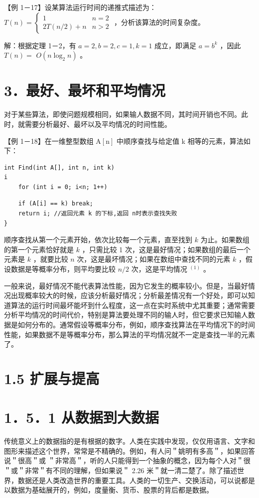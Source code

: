 \documentclass[10pt]{article}
\begin{document}
【例 1－17】设某算法运行时间的递推式描述为：$T(n)=\left\{\begin{array}{ll}1 & n=2 \\ 2 T(n / 2)+n & n>2\end{array}\right.$ ，分析该算法的时间复杂度。

解：根据定理 1－2，有 $a=2, b=2, c=1, k=1$ 成立，即满足 $a=b^{k}$ ，因此 $T(n)=$ $O\left(n \log _{2} n\right)$ 。

\section*{3．最好、最坏和平均情况}
对于某些算法，即使问题规模相同，如果输人数据不同，其时间开销也不同。此时，就需要分析最好、最坏以及平均情况的时间性能。

【例 1－18】在一维整型数组 $\mathrm{A}[\mathrm{n}]$ 中顺序查找与给定值 k 相等的元素，算法如下：

\begin{verbatim}
int Find(int A[], int n, int k)
i
    for (int i = 0; i<n; 1++)
\end{verbatim}

\begin{verbatim}
    if (A[i] == k) break;
    return i; //返回元素 k 的下标,返回 n时表示查找失败
}
\end{verbatim}

顺序查找从第一个元素开始，依次比较每一个元素，直至找到 $k$ 为止。如果数组的第一个元素恰好就是 $k$ ，只需比较 1 次，这是最好情况；如果数组的最后一个元素是 $k$ ，就要比较 $n$ 次，这是最坏情况；如果在数组中查找不同的元素 $k$ ，假设数据是等概率分布，则平均要比较 $n / 2$ 次，这是平均情况 ${ }^{(1)}$ 。

一般来说，最好情况不能代表算法性能，因为它发生的概率较小。但是，当最好情况出现概率较大的时候，应该分析最好情况；分析最差情况有一个好处，即可以知道算法的运行时间最坏能坏到什么程度，这一点在实时系统中尤其重要；通常需要分析平均情况的时间代价，特别是算法要处理不同的输人时，但它要求已知输人数据是如何分布的。通常假设等概率分布，例如，顺序查找算法在平均情况下的时间性能，如果数据不是等概率分布，那么算法的平均情况就不一定是查找一半的元素了。

\section*{1.5 扩展与提高}
\section*{1．5．1 从数据到大数据}
传统意义上的数据指的是有根据的数字。人类在实践中发现，仅仅用语言、文字和图形来描述这个世界，常常是不精确的。例如，有人问＂姚明有多高＂，如果回答说＂很高＂或 ＂非常高＂，听的人只能得到一个抽象的概念，因为每个人对＂很＂或＂非常＂有不同的理解，但如果说＂ 2.26 米＂就一清二楚了。除了描述世界，数据还是人类改造世界的重要工具。人类的一切生产、交换活动，可以说都是以数据为基础展开的，例如，度量衡、货币、股票的背后都是数据。
\end{document}
